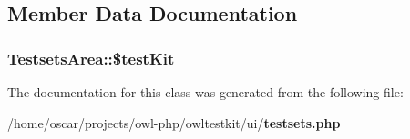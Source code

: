 \subsection{Member Data Documentation}
\subsubsection[{\$testKit}]{\setlength{\rightskip}{0pt plus 5cm}TestsetsArea::\$testKit\hspace{0.3cm}{\ttfamily  [private]}}\label{classTestsetsArea_a863cb429967969147d28d48e31fc745c}


The documentation for this class was generated from the following file:\begin{DoxyCompactItemize}
\item 
/home/oscar/projects/owl-\/php/owltestkit/ui/{\bf testsets.php}\end{DoxyCompactItemize}
